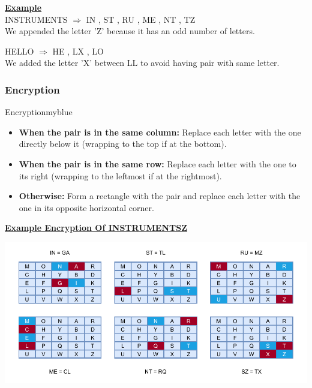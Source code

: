 \vspace{0.85cm}
\textbf{\underline{Example}}\\[0.4cm]
INSTRUMENTS \(\Longrightarrow\) IN , ST , RU , ME , NT , TZ\\[0.25cm]
We appended the letter 'Z' because it has an odd number of letters.

\vspace{0.5cm}
HELLO \(\Longrightarrow\) HE , LX , LO\\[0.25cm]
We added the letter 'X' between LL to avoid having pair with same letter.

\vspace{1cm}


\subsubsection{Encryption}

\begin{prettyBox}{Encryption}{myblue}
\begin{itemize}
    \item \textbf{When the pair is in the same column:} Replace each letter
with the one directly below it (wrapping to the top if at the bottom).
    \item \textbf{When the pair is in the same row:} Replace each letter with
the one to its right (wrapping to the leftmost if at the rightmost).
    \item \textbf{Otherwise:} Form a rectangle with the pair and replace each
letter with the one in its opposite horizontal corner.
\end{itemize}
\end{prettyBox}

\newpage

\textbf{\underline{Example Encryption Of INSTRUMENTSZ}}

\vspace{0.5cm}


\begin{center}
    \includegraphics{Chapters/Diagram/Crypto/pf1.drawio.pdf}
\end{center}


